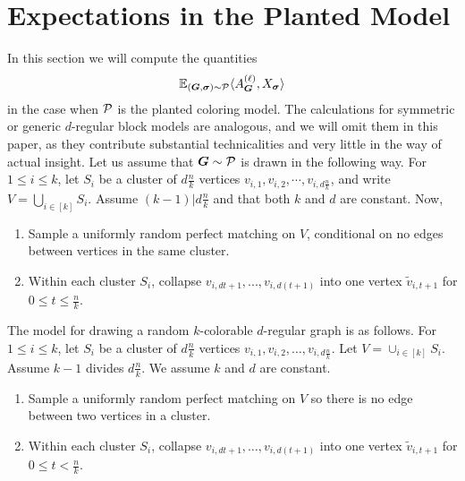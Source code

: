 
\newcommand{\Proj}[1]{\Pi_{#1}}
\newcommand{\Symm}[1]{\mathsf{Symm}\left(#1\right)}
\newcommand{\rank}{\mathsf{rank}}


\section{Expectations in the Planted Model} \label{sec:exp-calc}

In this section we will compute the quantities
$$
    \mathbb{E}_{(\boldsymbol{G},\boldsymbol{\sigma}) \sim \mathcal{P}} \langle A^{(\ell)}_{\boldsymbol{G}}, X_{\boldsymbol{\sigma}} \rangle
$$
in the case when $\mathcal{P}$ is the planted coloring model. The calculations for symmetric or generic $d$-regular block models are analogous, and we will omit them in this paper, as they contribute substantial technicalities and very little in the way of actual insight. Let us assume that $\boldsymbol{G} \sim \mathcal{P}$ is drawn in the following way. For $1 \le i \le k$, let $S_i$ be a cluster of $d\frac{n}{k}$ vertices $v_{i,1},v_{i,2},\cdots,v_{i,d\frac{n}{k}}$, and write $V = \bigcup_{i\in [k]} S_i$. Assume $(k-1)|d\frac{n}{k}$ and that both $k$ and $d$ are constant. Now,

\begin{enumerate}
    \item Sample a uniformly random perfect matching on $V$, conditional on no edges between vertices in the same cluster.
    \item Within each cluster $S_i$, collapse $v_{i,dt+1},...,v_{i,d(t+1)}$ into one vertex $\widetilde{v}_{i,t+1}$ for $0 \le t \le \frac{n}{k}$.
\end{enumerate}

The model for drawing a random $k$-colorable $d$-regular graph is as follows.  For $1\le i\le k$, let $S_i$ be a cluster of $d\frac{n}{k}$ vertices $v_{i,1}, v_{i,2}, \dots, v_{i,d\frac{n}{k}}$.  Let $V = \cup_{i\in[k]} S_i$.  Assume $k-1$ divides $d\frac{n}{k}$.  We assume $k$ and $d$ are constant.
\begin{enumerate}
\item \label{step:sample-matching} Sample a uniformly random perfect matching on $V$ so there is no edge between two vertices in a cluster.
\item \label{step:collapse} Within each cluster $S_i$, collapse $v_{i,dt+1},\dots,v_{i,d(t+1)}$ into one vertex $\widetilde{v}_{i,t+1}$ for $0\le t < \frac{n}{k}$.
\end{enumerate}

